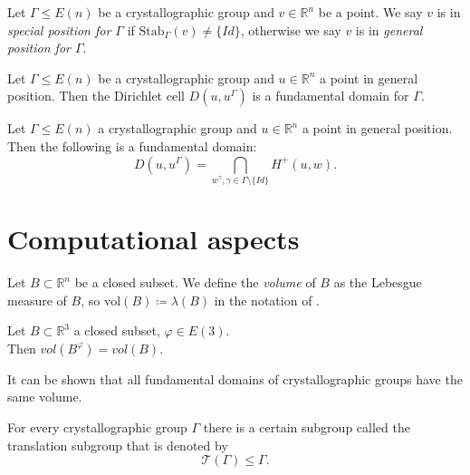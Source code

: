 \documentclass{beamer}
\theoremstyle{plain}
\newcommand\R{\mathbb R}
\renewcommand{\phi}{\varphi}
\newcommand{\stab}{\mathrm{Stab}}
\newcommand{\vol}{\mathrm{vol}}
\newcommand{\T}{\mathcal{T}}
\begin{document}
\begin{frame}
    \begin{definition}\label{def:special-gen-pos}
        Let $\Gamma \leq E(n)$ be a crystallographic group and $v \in \R^n$ be a point.
        We say $v$ is in \emph{special position for $\Gamma$} if $\stab_{\Gamma}(v) \neq \{Id\}$, \pause otherwise we say $v$ is in \emph{general position for $\Gamma$}.
    \end{definition}

    \begin{theorem}
        Let $\Gamma \leq E(n)$ be a crystallographic group and $u \in \R^n$ a point in general position. \pause
        Then the Dirichlet cell $D(u, u^\Gamma)$ is a fundamental domain for $\Gamma$.
    \end{theorem}
    \pause
    \begin{example}
        Let $\Gamma \leq E(n)$ a crystallographic group and $u \in \R^n$ a point in general position. Then the following is a fundamental domain:
        $$
            D(u, u^\Gamma) = \bigcap_{w^\gamma, \gamma \in \Gamma \setminus \{ Id \}} H^+(u, w).
        $$
    \end{example}
\end{frame}

\section{Computational aspects}
\begin{frame}
    \begin{definition}[Volume]
        Let $B\subset \R^n$ be a closed subset. 
        We define the \emph{volume} of $B$ as the Lebesgue measure of $B$, so $\vol(B) \coloneqq \lambda(B)$ in the notation of \cite{forster2012analysis3}. 
    \end{definition} \pause

    \begin{theorem}
        Let $B \subset \R^3$ a closed subset, $\phi \in E(3)$. \\ \pause
        Then $vol(B^\phi) = vol(B)$.
    \end{theorem}
    \pause
    It can be shown that all fundamental domains of crystallographic groups have the same volume.
\end{frame}

\begin{frame}
    \begin{remark}
        For every crystallographic group $\Gamma$ there is a certain subgroup called the translation subgroup that is denoted by 
        $$
            \T(\Gamma) \leq \Gamma.
        $$
    \end{remark}
\end{frame}
\end{document}

